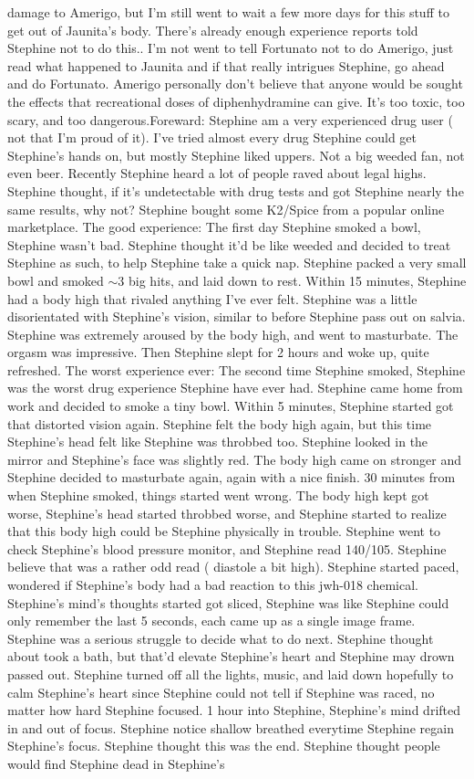 \documentclass[12pt]{book}
\begin{document}
damage to Amerigo, but I'm still went to wait a few more days for this stuff to get out of Jaunita's body. There's already enough experience reports told Stephine not to do this.. I'm not went to tell Fortunato not to do Amerigo, just read what happened to Jaunita and if that really intrigues Stephine, go ahead and do Fortunato. Amerigo personally don't believe that anyone would be sought the effects that recreational doses of diphenhydramine can give. It's too toxic, too scary, and too dangerous.Foreward: Stephine am a very experienced drug user ( not that I'm proud of it). I've tried almost every drug Stephine could get Stephine's hands on, but mostly Stephine liked uppers. Not a big weeded fan, not even beer. Recently Stephine heard a lot of people raved about legal highs. Stephine thought, if it's undetectable with drug tests and got Stephine nearly the same results, why not? Stephine bought some K2/Spice from a popular online marketplace. The good experience: The first day Stephine smoked a bowl, Stephine wasn't bad. Stephine thought it'd be like weeded and decided to treat Stephine as such, to help Stephine take a quick nap. Stephine packed a very small bowl and smoked $\sim$3 big hits, and laid down to rest. Within 15 minutes, Stephine had a body high that rivaled anything I've ever felt. Stephine was a little disorientated with Stephine's vision, similar to before Stephine pass out on salvia. Stephine was extremely aroused by the body high, and went to masturbate. The orgasm was impressive. Then Stephine slept for 2 hours and woke up, quite refreshed. The worst experience ever: The second time Stephine smoked, Stephine was the worst drug experience Stephine have ever had. Stephine came home from work and decided to smoke a tiny bowl. Within 5 minutes, Stephine started got that distorted vision again. Stephine felt the body high again, but this time Stephine's head felt like Stephine was throbbed too. Stephine looked in the mirror and Stephine's face was slightly red. The body high came on stronger and Stephine decided to masturbate again, again with a nice finish. 30 minutes from when Stephine smoked, things started went wrong. The body high kept got worse, Stephine's head started throbbed worse, and Stephine started to realize that this body high could be Stephine physically in trouble. Stephine went to check Stephine's blood pressure monitor, and Stephine read 140/105. Stephine believe that was a rather odd read ( diastole a bit high). Stephine started paced, wondered if Stephine's body had a bad reaction to this jwh-018 chemical. Stephine's mind's thoughts started got sliced, Stephine was like Stephine could only remember the last 5 seconds, each came up as a single image frame. Stephine was a serious struggle to decide what to do next. Stephine thought about took a bath, but that'd elevate Stephine's heart and Stephine may drown passed out. Stephine turned off all the lights, music, and laid down hopefully to calm Stephine's heart since Stephine could not tell if Stephine was raced, no matter how hard Stephine focused. 1 hour into Stephine, Stephine's mind drifted in and out of focus. Stephine notice shallow breathed everytime Stephine regain Stephine's focus. Stephine thought this was the end. Stephine thought people would find Stephine dead in Stephine's 
\end{document}
